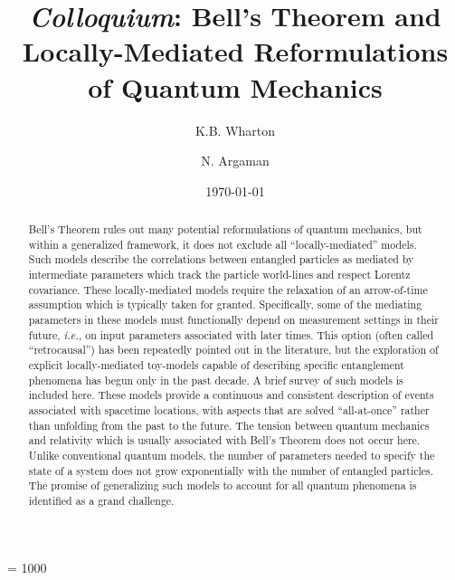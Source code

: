 \documentclass[onecolumn, nofootinbib, 12pt]{revtex4-1}
\begin{document}
\count\footins = 1000

\title{{\it Colloquium}: Bell's Theorem and Locally-Mediated Reformulations of Quantum Mechanics}
\author{K.B. Wharton}
\author{N. Argaman}
\date{\today}       %

\begin{abstract}

Bell's Theorem rules out many potential reformulations of quantum mechanics, but within a generalized framework, it does not exclude all ``locally-mediated'' models.  Such models describe the correlations between entangled particles as mediated by intermediate parameters which track the particle world-lines and respect Lorentz covariance.  These locally-mediated models require the relaxation of an arrow-of-time assumption which is typically taken for granted.  Specifically, some of the mediating parameters in these models must functionally depend on measurement settings in their future, \emph{i.e.}, on input parameters associated with later times.  This option (often called ``retrocausal'') has been repeatedly pointed out in the literature, but the exploration of explicit locally-mediated toy-models capable of describing specific entanglement phenomena has begun only in the past decade.  A brief survey of such models is included here.  These models provide a continuous and consistent description of events associated with spacetime locations, with aspects that are solved ``all-at-once'' rather than unfolding from the past to the future.  The tension between quantum mechanics and relativity which is usually associated with Bell's Theorem does not occur here.  Unlike conventional quantum models, the number of parameters needed to specify the state of a system does not grow exponentially with the number of entangled particles.  The promise of generalizing such models to account for all quantum phenomena is identified as a grand challenge.

\end{abstract}


\maketitle
\end{document}
